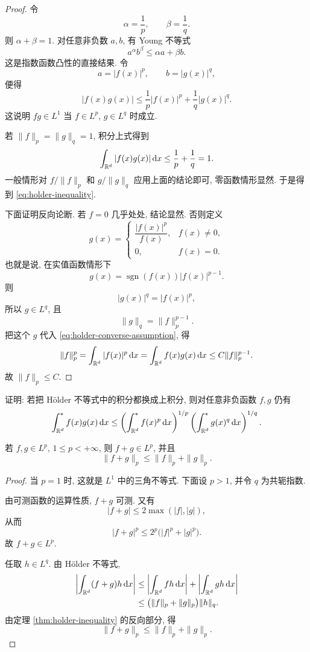\begin{proof}
	令
	\[
	\alpha=\frac1p,
	\qquad
	\beta=\frac1q.
	\]
	则 \(\alpha+\beta=1\). 对任意非负数 \(a,b\), 有 Young 不等式
	\[
	a^\alpha b^\beta\leq \alpha a+\beta b.
	\]
	这是指数函数凸性的直接结果. 令
	\[
	a=|f(x)|^p,
	\qquad
	b=|g(x)|^q,
	\]
	便得
	\[
	|f(x)g(x)|
	\leq
	\frac1p|f(x)|^p+\frac1q|g(x)|^q.
	\]
	这说明 \(fg\in L^1\) 当 \(f\in L^p\), \(g\in L^q\) 时成立.
	
	若 \(\|f\|_p=\|g\|_q=1\), 积分上式得到
	\[
	\int_{\mathbb{R}^d}|f(x)g(x)|\,\dd x
	\leq
	\frac1p+\frac1q=1.
	\]
	一般情形对 \(f/\|f\|_p\) 和 \(g/\|g\|_q\) 应用上面的结论即可, 零函数情形显然. 于是得到 \eqref{eq:holder-inequality}.
	
	下面证明反向论断. 若 \(f=0\) 几乎处处, 结论显然. 否则定义
	\[
	g(x)=
	\begin{cases}
		\dfrac{|f(x)|^p}{f(x)}, & f(x)\neq0,\\[0.8em]
		0, & f(x)=0.
	\end{cases}
	\]
	也就是说, 在实值函数情形下
	\[
	g(x)=\operatorname{sgn}(f(x))|f(x)|^{p-1}.
	\]
	则
	\[
	|g(x)|^q=|f(x)|^p,
	\]
	所以 \(g\in L^q\), 且
	\[
	\|g\|_q=\|f\|_p^{p-1}.
	\]
	把这个 \(g\) 代入 \eqref{eq:holder-converse-assumption}, 得
	\[
	\|f\|_p^p
	=
	\int_{\mathbb{R}^d}|f(x)|^p\,\dd x
	=
	\int_{\mathbb{R}^d}f(x)g(x)\,\dd x
	\leq
	C\|f\|_p^{p-1}.
	\]
	故 \(\|f\|_p\leq C\).
\end{proof}

\begin{exer}
	\label{exer:holder-upper-integral}
	证明: 若把 H\"older 不等式中的积分都换成上积分, 则对任意非负函数 \(f,g\) 仍有
	\[
	\int_{\mathbb{R}^d}^{*}f(x)g(x)\,\dd x
	\leq
	\left(\int_{\mathbb{R}^d}^{*}f(x)^p\,\dd x\right)^{1/p}
	\left(\int_{\mathbb{R}^d}^{*}g(x)^q\,\dd x\right)^{1/q}.
	\]
\end{exer}

\begin{thm}
	\label{thm:minkowski-inequality}
	若 \(f,g\in L^p\), \(1\leq p<+\infty\), 则 \(f+g\in L^p\), 并且
	\begin{equation}
		\|f+g\|_p\leq \|f\|_p+\|g\|_p.
		\label{eq:minkowski-inequality}
	\end{equation}
\end{thm}

\begin{proof}
	当 \(p=1\) 时, 这就是 \(L^1\) 中的三角不等式. 下面设 \(p>1\), 并令 \(q\) 为共轭指数.
	
	由可测函数的运算性质, \(f+g\) 可测. 又有
	\[
	|f+g|\leq 2\max(|f|,|g|),
	\]
	从而
	\[
	|f+g|^p\leq 2^p\bigl(|f|^p+|g|^p\bigr).
	\]
	故 \(f+g\in L^p\).
	
	任取 \(h\in L^q\). 由 H\"older 不等式,
	\begin{align*}
		\left|\int_{\mathbb{R}^d}(f+g)h\,\dd x\right|
		&\leq
		\left|\int_{\mathbb{R}^d}fh\,\dd x\right|
		+
		\left|\int_{\mathbb{R}^d}gh\,\dd x\right|\\
		&\leq
		\bigl(\|f\|_p+\|g\|_p\bigr)\|h\|_q.
	\end{align*}
	由定理 \ref{thm:holder-inequality} 的反向部分, 得
	\[
	\|f+g\|_p\leq \|f\|_p+\|g\|_p.
	\]
\end{proof}

